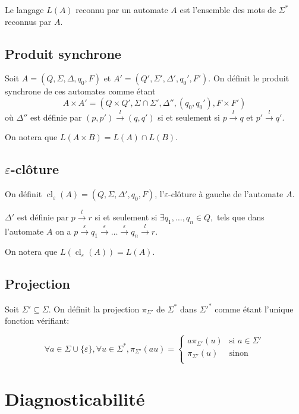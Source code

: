 \documentclass[10pt,a4paper]{article}
\begin{document}
Le langage $L(A)$ reconnu par un automate $A$ est l'ensemble des mots de $\Sigma^*$ reconnus par $A$.

\subsection{Produit synchrone}

Soit $A = (Q, \Sigma, \Delta, q_0, F)$ et $A' = (Q', \Sigma', \Delta', q_0', F')$. On définit le produit synchrone de ces automates comme \'etant $$A\times A' = (Q \times Q', \Sigma \cap \Sigma', \Delta'', (q_0, q_0'), F\times F')$$ o\`u $\Delta''$ est d\'efinie par $(p,p')\overset{l}{{\to}}(q,q')$ si et seulement si $p\overset{l}{{\to}}q$ et $p'\overset{l}{{\to}}q'$.

On notera que $L(A\times B) = L(A) \cap L(B)$.

\subsection{$\varepsilon$-clôture}

On définit  $\operatorname{cl}_\varepsilon(A) = (Q, \Sigma, \Delta', q_0, F)$, l'$\varepsilon$-clôture \`a gauche de l'automate $A$.

$\Delta'$ est d\'efinie par $p \overset{l}{{\to}} r$ si et seulement si $\exists q_1,\dots,q_n \in Q,$ tels que dans l'automate $A$ on a  $p \overset{\varepsilon}{{\to}} q_1 \overset{\varepsilon}{{\to}} \dots \overset{\varepsilon}{{\to}} q_n \overset{l}{{\to}} r$.

On notera que $L(\operatorname{cl}_\varepsilon(A))=L(A)$.

\subsection{Projection}

Soit $\Sigma'\subseteq \Sigma$. On d\'efinit la projection $\pi_{\Sigma'}$ de $\Sigma^*$ dans $\Sigma'^*$ comme \'etant l'unique fonction v\'erifiant:

$$\forall a \in \Sigma \cup \{\varepsilon\}, \forall u \in \Sigma^*, \pi_{\Sigma'}(au)=
\left\{\begin{array}{ll}
a\pi_{\Sigma'}(u) &\text{si } a\in \Sigma'\\
\pi_{\Sigma'}(u) &\text{sinon} \\
\end{array}\right.$$

\section{Diagnosticabilit\'e}
\end{document}
